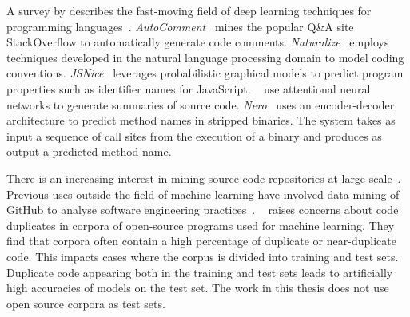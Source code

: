 A \citeyear{Allamanis2017a} survey by \citeauthor{Allamanis2017a} describes the fast-moving field of deep learning techniques for programming languages~\cite{Allamanis2017a}.
\emph{AutoComment}~\cite{Wong2013} mines the popular Q\&A site StackOverflow to automatically generate code comments.
\emph{Naturalize}~\cite{Allamanis2014a} employs techniques developed in the natural language processing domain to model coding conventions.
\emph{JSNice}~\cite{Raychev2015} leverages probabilistic graphical models to predict program properties such as identifier names for JavaScript.
\citeauthor{Allamanis2016}~\cite{Allamanis2016} use attentional neural networks to generate summaries of source code.
\emph{Nero}~\cite{David2019} uses an encoder-decoder architecture to predict method names in stripped binaries. The system takes as input a sequence of call sites from the execution of a binary and produces as output a predicted method name.

There is an increasing interest in mining source code repositories at large scale~\cite{Allamanis2013a,White2015a,Bird2009}. Previous uses outside the field of machine learning have involved data mining of GitHub to analyse software engineering practices~\cite{Wu2014,Guzman2014,Baishakhi2014a,Vasilescu2015}.
\citeauthor{Allamanis2018}~\cite{Allamanis2018} raises concerns about code duplicates in corpora of open-source programs used for machine learning. They find that corpora often contain a high percentage of duplicate or near-duplicate code. This impacts cases where the corpus is divided into training and test sets. Duplicate code appearing both in the training and test sets leads to artificially high accuracies of models on the test set. The work in this thesis does not use open source corpora as test sets.

